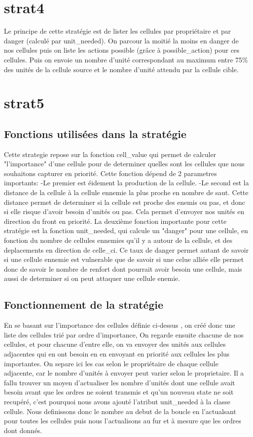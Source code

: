 \documentclass{rapport}
\begin{document}
		\section{strat4}
			Le principe de cette stratégie est de lister les cellules par propriétaire et par
			danger (calculé par unit\_needed). On parcour la moitié la moins en danger de nos cellules puis on liste les actions possible (grâce à possible\_action) pour ces cellules.
			Puis on envoie un nombre d'unité correspondant au maximum entre 75\% des unités de la cellule source et le nombre d'unité attendu par la cellule cible.
		\section{strat5}
			\subsection{Fonctions utilisées dans la stratégie}
Cette strategie repose sur la fonction cell\_value qui permet de calculer "l'importance" d'une cellule
pour de determiner quelles sont les cellules que nous souhaitons capturer en priorité.
Cette fonction dépend de 2 parametres importants:
		-Le premier est éidement la production de la cellule.
		-Le second est la distance de la cellule à la cellule ennemie la plus proche en nombre de saut. Cette distance
permet de determiner si la cellule est proche des enemis ou pas, et donc si elle risque d'avoir besoin d'unités ou pas.
Cela permet d'envoyer nos unités en direction du front en priorité.
La deuxième fonction importante pour cette stratégie est la fonction unit\_needed, qui calcule un "danger" pour une cellule,
en fonction du nombre de cellules ennemies qu'il y a autour de la cellule, et des deplacements en direction de celle\_ci.
Ce taux de danger permet autant de savoir si une cellule ennemie est vulnerable que de savoir si une celue alliée elle permet donc
de savoir le nombre de renfort dont pourrait avoir besoin une cellule, mais aussi de determiner si on peut attaquer une cellule enemie.
			\subsection{Fonctionnement de la stratégie}
En se basant sur l'importance des cellules définie ci-dessus , on créé donc une liste des cellules trié par ordre d'importance,
On regarde ensuite chacune de nos cellules, et pour chacune d'entre elle, on va envoyer des unités aux cellules adjacentes qui en ont besoin
en en envoyant en priorité aux cellules les plus importantes.
On separe ici les cas selon le propriétaire de chaque cellule adjacente, car le nombre d'unités à envoyer peut varier selon le proprietaire.
Il a fallu trouver un moyen d'actualiser les nombre d'unités dont une cellule avait besoin avant que les ordres ne soient transmis et qu'un nouveau
state ne soit recupéré, c'est pourquoi nous avons ajouté l'atribut unit\_needed à la classe cellule. Nous definissons donc le nombre au debut de la boucle
en l'actualsant pour toutes les cellules puis nous l'actualisons au fur et à mesure que les ordres dont donnés.
\end{document}
